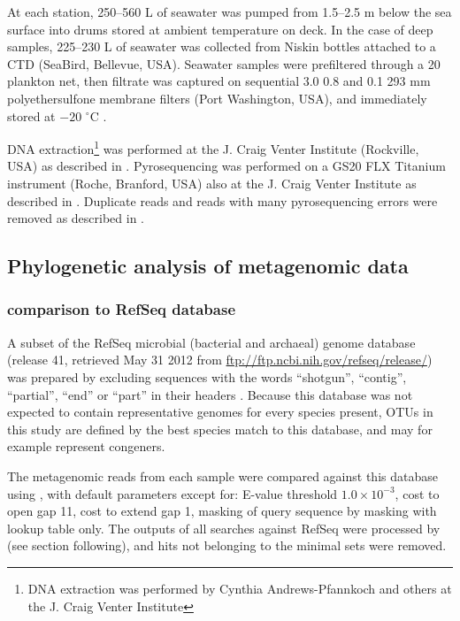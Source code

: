 At each station, \textapprox{} 250--560 L of seawater was pumped from \textapprox{} 1.5--2.5 m below the sea surface into drums stored at ambient temperature on deck. 
In the case of deep samples, \textapprox{} 225--230 L of seawater was collected from Niskin bottles attached to a \ac{CTD} (SeaBird, Bellevue, USA).
Seawater samples were prefiltered through a 20 \micron{} plankton net, then filtrate was captured on sequential 3.0 \micron{} 0.8 \micron{} and 0.1 \micron{} 293 mm polyethersulfone membrane filters (Port Washington, USA), and immediately stored at $-20$ $^\circ$C \cite{Rusch:2007ez,Ng:2010cd}.

DNA extraction\footnote{DNA extraction was performed by Cynthia Andrews-Pfannkoch and others at the J. Craig Venter Institute} was performed at the J. Craig Venter Institute (Rockville, USA) as described in \citet{Rusch:2007ez}.
Pyrosequencing was performed on a GS20 FLX Titanium instrument (Roche, Branford, USA) also at the J. Craig Venter Institute as described in \citet{Lauro:2010jna}.
Duplicate reads and reads with many pyrosequencing errors were removed as described in \citet{Lauro:2010jna}.

\subsection{Phylogenetic analysis of metagenomic data}

\subsubsection{ comparison to RefSeq database}

A subset of the RefSeq microbial (bacterial and archaeal) genome database (release 41, retrieved May 31 2012 from \url{ftp://ftp.ncbi.nih.gov/refseq/release/}) was prepared by excluding sequences with the words ``shotgun'', ``contig'', ``partial'', ``end'' or ``part'' in their headers \cite{Angly:2009ip}.
Because this database was not expected to contain representative genomes for every species present, \acp{OTU} in this study are defined by the best species match to this database, and may for example represent congeners.

The metagenomic reads from each sample were compared against this database using , with default parameters except for: E-value threshold $1.0\times{}10^{-3}$, cost to open gap 11, cost to extend gap 1, masking of query sequence by  masking with lookup table only.
The outputs of all  searches against RefSeq were processed by  (see section following), and hits not belonging to the minimal sets were removed.

